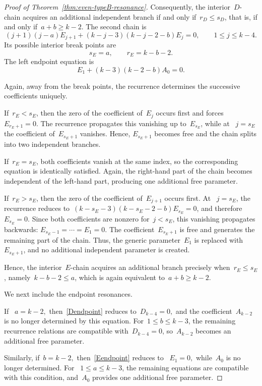 \documentclass[12pt,a4paper]{amsart}
\theoremstyle{thm}
\theoremstyle{definition}
\begin{document}
\begin{proof}[Proof of Theorem~\textup{\ref{thm:even-typeB-resonance}}]
Consequently, the interior~\(D\)-chain acquires an additional
independent branch if and only if~$r_D\leq s_D$, that is,
if and only if~$a+b\geq k-2$.
The second chain is
\begin{equation}\label{last2}
(j+1)(j-a)E_{j+1}
+
(k-j-3)(k-j-2-b)E_j=0,
\qquad
1\leq j\leq k-4.
\end{equation}
Its possible interior break points are
\[
s_E=a,
\qquad
r_E=k-b-2.
\]
The left endpoint equation is
\begin{equation}\label{Eendpoint}
E_1+(k-3)(k-2-b)A_0=0.
\end{equation}

Again, away from the break points, the recurrence determines the
successive coefficients uniquely.

If~$r_E<s_E$,
then the zero of the coefficient of~\(E_j\) occurs first and forces~$E_{r_E+1}=0$.
The recurrence propagates this vanishing up to~\(E_{s_E}\), while at~%
\(j=s_E\) the coefficient of~\(E_{s_E+1}\) vanishes. Hence,
\(E_{s_E+1}\) becomes free and the chain splits into two independent
branches.

If~$r_E=s_E$,
both coefficients vanish at the same index, so the corresponding
equation is identically satisfied. Again, the right-hand part of the
chain becomes independent of the left-hand part, producing one
additional free parameter.

If~$r_E>s_E$,
then the zero of the coefficient of~\(E_{j+1}\) occurs first. At~%
\(j=s_E\), the recurrence reduces to~$(k-s_E-3)(k-s_E-2-b)E_{s_E}=0$,
and therefore~$E_{s_E}=0$.
Since both coefficients are nonzero for~\(j<s_E\), this vanishing
propagates backwards: $E_{s_E-1}=\cdots=E_1=0$.
The coefficient~\(E_{s_E+1}\) is free and generates the remaining
part of the chain. Thus, the generic parameter~\(E_1\) is replaced with~%
\(E_{s_E+1}\), and no additional independent parameter is created.

Hence, the interior~\(E\)-chain acquires an additional branch precisely
when~$r_E\leq s_E$,
namely~$k-b-2\leq a$,
which is again equivalent to~$a+b\geq k-2$.

We next include the endpoint resonances.

If~%
$a=k-2,$ then~\eqref{Dendpoint} reduces to~$D_{k-4}=0,$ and the coefficient~\(A_{k-2}\) is no longer determined by this
equation. For~\(1\leq b\leq k-3\), the remaining recurrence relations
are compatible with~\(D_{k-4}=0\), so~\(A_{k-2}\) becomes an
additional free parameter.

Similarly, if~$b=k-2,$ then~\eqref{Eendpoint} reduces to~%
$
E_1=0,
$
while~\(A_0\) is no longer determined. For~%
\(1\leq a\leq k-3\), the remaining equations are compatible with this
condition, and~\(A_0\) provides one additional free parameter.


\end{proof}
\end{document}

